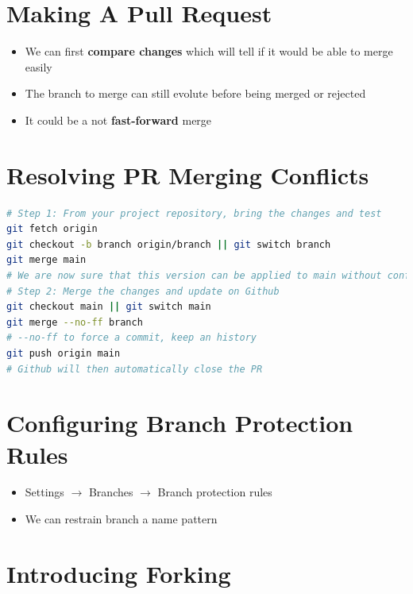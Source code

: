 \documentclass{report}
\begin{document}
\section{Making A Pull Request}

\begin{itemize}
	\item We can first \textbf{compare changes} which will tell if it would be able to merge easily 
	\item The branch to merge can still evolute before being merged or rejected 
	\item It could be a not \textbf{fast-forward} merge
\end{itemize}


\section{Resolving PR Merging Conflicts}

\begin{tcolorbox}[title=Checking out via command line,colback=backcolour]
\begin{lstlisting}[language=bash]
# Step 1: From your project repository, bring the changes and test
git fetch origin
git checkout -b branch origin/branch || git switch branch
git merge main
# We are now sure that this version can be applied to main without conflicts
# Step 2: Merge the changes and update on Github
git checkout main || git switch main
git merge --no-ff branch
# --no-ff to force a commit, keep an history
git push origin main
# Github will then automatically close the PR
\end{lstlisting}
\end{tcolorbox}


\section{Configuring Branch Protection Rules}

\begin{itemize}
	\item Settings $\rightarrow$ Branches $\rightarrow$ Branch protection rules 
	\item We can restrain branch a name pattern 
\end{itemize}


\section{Introducing Forking}
\end{document}
